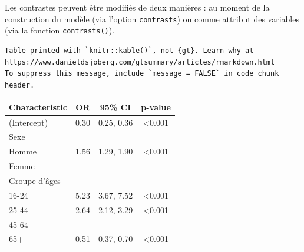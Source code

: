 \documentclass[
  letterpaper,
  DIV=11,
  numbers=noendperiod,
  oneside]{scrreprt}
\newenvironment{Shaded}{\begin{snugshade}}{\end{snugshade}}
\newcommand{\AttributeTok}[1]{\textcolor[rgb]{0.40,0.45,0.13}{#1}}
\newcommand{\ConstantTok}[1]{\textcolor[rgb]{0.56,0.35,0.01}{#1}}
\newcommand{\DecValTok}[1]{\textcolor[rgb]{0.68,0.00,0.00}{#1}}
\newcommand{\FunctionTok}[1]{\textcolor[rgb]{0.28,0.35,0.67}{#1}}
\newcommand{\NormalTok}[1]{\textcolor[rgb]{0.00,0.23,0.31}{#1}}
\newcommand{\OtherTok}[1]{\textcolor[rgb]{0.00,0.23,0.31}{#1}}
\newcommand{\SpecialCharTok}[1]{\textcolor[rgb]{0.37,0.37,0.37}{#1}}
\begin{document}
Les contrastes peuvent être modifiés de deux manières : au moment de la
construction du modèle (via l'option \texttt{contrasts}) ou comme
attribut des variables (via la fonction \texttt{contrasts()}).

\begin{Shaded}
\end{Shaded}

\begin{verbatim}
Table printed with `knitr::kable()`, not {gt}. Learn why at
https://www.danieldsjoberg.com/gtsummary/articles/rmarkdown.html
To suppress this message, include `message = FALSE` in code chunk header.
\end{verbatim}

\begin{longtable}[]{@{}lccc@{}}
\toprule()
\textbf{Characteristic} & \textbf{OR} & \textbf{95\% CI} &
\textbf{p-value} \\
\midrule()
\endhead
(Intercept) & 0.30 & 0.25, 0.36 & \textless0.001 \\
Sexe & & & \\
Homme & 1.56 & 1.29, 1.90 & \textless0.001 \\
Femme & --- & --- & \\
Groupe d'âges & & & \\
16-24 & 5.23 & 3.67, 7.52 & \textless0.001 \\
25-44 & 2.64 & 2.12, 3.29 & \textless0.001 \\
45-64 & --- & --- & \\
65+ & 0.51 & 0.37, 0.70 & \textless0.001 \\
\bottomrule()
\end{longtable}
\end{document}
